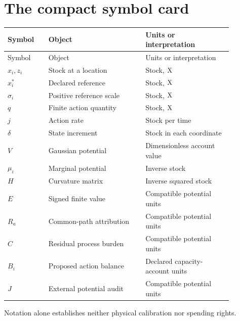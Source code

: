 \section*{The compact symbol card}
\begingroup\small
\begin{longtable}{P{0.16\linewidth}P{0.38\linewidth}P{0.34\linewidth}}\toprule
Symbol & Object & Units or interpretation\\\midrule
\endfirsthead
\toprule Symbol & Object & Units or interpretation\\\midrule
\endhead
$x_i,z_i$ & Stock at a location & Stock, $\mathrm{X}$\\
$x_i^*$ & Declared reference & Stock, $\mathrm{X}$\\
$\sigma_i$ & Positive reference scale & Stock, $\mathrm{X}$\\
$q$ & Finite action quantity & Stock, $\mathrm{X}$\\
$j$ & Action rate & Stock per time\\
$\delta$ & State increment & Stock in each coordinate\\
$V$ & Gaussian potential & Dimensionless account value\\
$\mu_i$ & Marginal potential & Inverse stock\\
$H$ & Curvature matrix & Inverse squared stock\\
$E$ & Signed finite value & Compatible potential units\\
$R_a$ & Common-path attribution & Compatible potential units\\
$C$ & Residual process burden & Compatible potential units\\
$B_i$ & Proposed action balance & Declared capacity-account units\\
$J$ & External potential audit & Compatible potential units\\\bottomrule
\end{longtable}
\endgroup

Notation alone establishes neither physical calibration nor spending rights.
